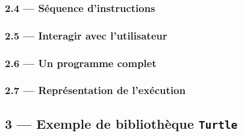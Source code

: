 \documentclass[a4paper,17pt]{extarticle}
\begin{document}
    \hypertarget{suxe9quence-dinstructions}{%
\subsubsection{2.4 --- Séquence
d'instructions}\label{suxe9quence-dinstructions}}

    

    \hypertarget{interagir-avec-lutilisateur}{%
\subsubsection{2.5 --- Interagir avec
l'utilisateur}\label{interagir-avec-lutilisateur}}

    \hypertarget{un-programme-complet}{%
\subsubsection{2.6 --- Un programme
complet}\label{un-programme-complet}}

    \hypertarget{repruxe9sentation-de-lexuxe9cution}{%
\subsubsection{2.7 --- Représentation de
l'exécution}\label{repruxe9sentation-de-lexuxe9cution}}

    \hypertarget{exemple-de-bibliothuxe8que-turtle}{%
\subsection{\texorpdfstring{3 --- Exemple de bibliothèque
\texttt{Turtle}}{3 --- Exemple de bibliothèque Turtle}}\label{exemple-de-bibliothuxe8que-turtle}}

    


    
    
    
\end{document}
